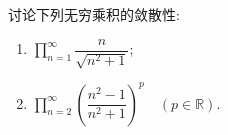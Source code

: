 \documentclass[../数学分析培优讲义.tex]{subfiles}
\begin{document}
\begin{example}
讨论下列无穷乘积的敛散性:
\begin{enumerate}[label=(\arabic*)]
    \item $\displaystyle\prod\limits_{n=1}^{\infty}\dfrac{n}{\sqrt{n^2+1}}$;
    \item $\displaystyle\prod\limits_{n=2}^{\infty}\left(\dfrac{n^2-1}{n^2+1}\right)^p\quad(p\in\mathbb{R})$.
\end{enumerate}
\end{example}
\exampleblank
\end{document}
